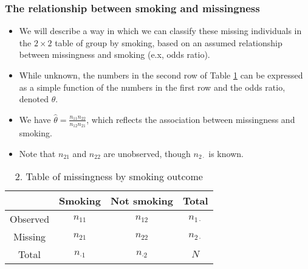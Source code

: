 \documentclass{beamer}
\begin{document}
\begin{frame}
\frametitle{The relationship between smoking and missingness}
\begin{itemize}
\item We will describe a way in which we can classify these missing individuals in the $2\times 2$ table of group by smoking, based on an assumed relationship between missingness and smoking (e.x, odds ratio).
\vspace{10pt} 
\item While unknown, the numbers in the second row of Table \ref{tbl1} can be expressed as a simple function of the numbers in the first row and the odds ratio, denoted $\theta$.
\vspace{10pt} 
\item We have $\hat\theta = \frac{n_{11}n_{22}}{n_{12}n_{21}}$, which reflects the association between missingness and smoking.
\vspace{10pt} 
\item Note that $n_{21}$ and $n_{22}$ are unobserved, though $n_{2\cdot}$ is known.
\end{itemize}
\centering
\begin{table}
\caption{2. Table of missingness by smoking outcome}\label{tbl1}
\begin{tabular}{c|cc|c}\hline
 & Smoking & Not smoking & Total \\\hline
Observed & $n_{11}$ & $n_{12}$ & $n_{1\cdot}$\\
Missing & $n_{21}$ & $n_{22}$ & $n_{2\cdot}$\\\hline
Total  & $n_{\cdot1}$ & $n_{\cdot2}$ & $N$\\\hline
\end{tabular}
\end{table}
\end{frame}
\end{document}

